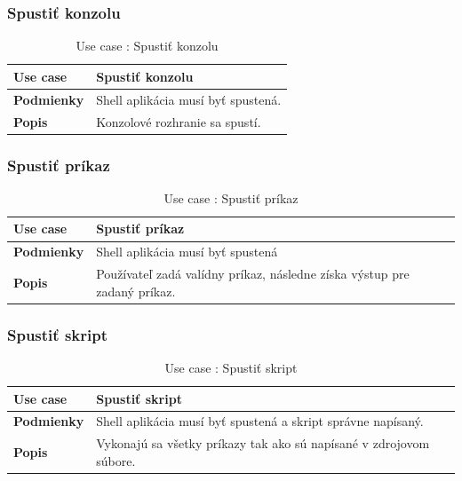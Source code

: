 \subsubsection{Spustiť konzolu}
\begin{center}
	\begin{table}[htbp]
		\begin{tabular}{|p{2.5cm}|p{14cm}|}
			\hline
			\textbf{Use case} & Spustiť konzolu \\ 
			\hline
			\textbf{Podmienky} & Shell aplikácia musí byť spustená.\\
			\hline
			\textbf{Popis} & Konzolové rozhranie sa spustí. \\ 
			\hline
		\end{tabular}
	\caption{Use case : Spustiť konzolu}
	\label{table:1}
	\end{table}
\end{center}
\subsubsection{Spustiť príkaz}
\begin{center}
	\begin{table}[htbp]
		\begin{tabular}{|p{2.5cm}|p{14cm}|}
		\hline
		\textbf{Use case} & Spustiť príkaz \\ 
		\hline
		\textbf{Podmienky} & Shell aplikácia musí byť spustená \\ 
		\hline
		\textbf{Popis} & Používateľ zadá valídny príkaz, následne získa výstup pre zadaný príkaz. \\ 
		\hline
		\end{tabular}
	\caption{Use case : Spustiť príkaz}
	\label{table:1}
	\end{table}
\end{center}
\subsubsection{Spustiť skript}
\begin{center}
	\begin{table}[htbp]
		\begin{tabular}{|p{2.5cm}|p{14cm}|}
			\hline
			\textbf{Use case} & Spustiť skript \\ 
			\hline
			\textbf{Podmienky} & Shell aplikácia musí byť spustená a skript správne napísaný.\\ 
			\hline
			\textbf{Popis} & Vykonajú sa všetky príkazy tak ako sú napísané v zdrojovom súbore. \\ 
			\hline
		\end{tabular}
	\label{table:1}
	\caption{Use case : Spustiť skript}
	\end{table}
\end{center}
\newpage

